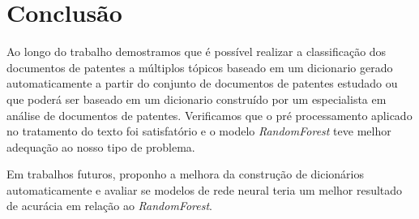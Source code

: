\chapter{Conclusão}

Ao longo do trabalho demostramos que é possível realizar a classificação dos documentos de patentes a múltiplos tópicos baseado em um dicionario gerado automaticamente a partir do conjunto de documentos de patentes estudado ou que poderá ser baseado em um dicionario construído por um especialista em análise de documentos de patentes. Verificamos que o pré processamento aplicado no tratamento do texto foi satisfatório e o modelo \textit{RandomForest} teve melhor adequação ao nosso tipo de problema.

Em trabalhos futuros, proponho a melhora da construção de dicionários automaticamente e avaliar se modelos de rede neural teria um melhor resultado de acurácia em relação ao \textit{RandomForest}.

